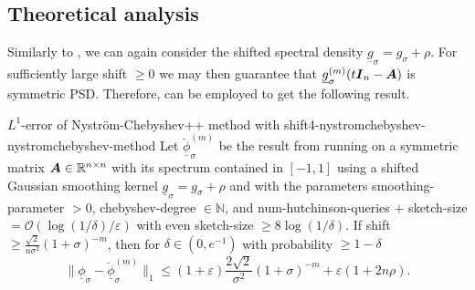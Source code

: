 
\subsection{Theoretical analysis}
\label{subsec:4-nystromchebyshev-analysis}


Similarly to , we can again consider
the shifted spectral density $\underline{g}_{\sigma} = g_{\sigma} + \rho$. For
sufficiently large \gls{shift} $\geq 0$ we may then guarantee that $\underline{g}_{\sigma}^{(m)}(t\boldsymbol{I}_n - \boldsymbol{A})$
is symmetric \gls{PSD}. Therefore,  can be
employed to get the following result.

\begin{theorem}{$L^1$-error of Nystr\"om-Chebyshev++ method with shift}{4-nystromchebyshev-nystromchebyshev-method}
    Let $\breve{\underline{\phi}}_{\sigma}^{(m)}$ be the result from running
     on a symmetric matrix
    $\boldsymbol{A} \in \mathbb{R}^{n \times n}$ with its spectrum contained in $[-1, 1]$
    using a shifted Gaussian smoothing kernel $\underline{g}_{\sigma} = g_{\sigma} + \rho$
    and with the parameters \gls{smoothing-parameter} $>0$, \gls{chebyshev-degree} $\in \mathbb{N}$, and
    \gls{num-hutchinson-queries} $+$ \gls{sketch-size} $=\mathcal{O}(\log(1/\delta)/\varepsilon)$
    with even \gls{sketch-size} $\geq 8 \log(1/\delta)$.
    If \gls{shift} $\geq \frac{\sqrt{2}}{n\sigma^2} (1 + \sigma)^{-m}$, then
    for $\delta \in (0, e^{-1})$ with probability $\geq 1-\delta$
    \begin{equation}
        \lVert \underline{\phi}_{\sigma} - \breve{\underline{\phi}}_{\sigma}^{(m)} \rVert _1
        \leq (1 + \varepsilon)  \frac{2\sqrt{2}}{\sigma^2} (1 + \sigma)^{-m} + \varepsilon(1 + 2 n \rho).
    \end{equation}
\end{theorem}

